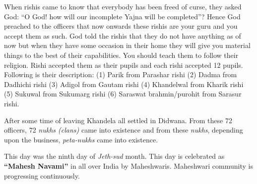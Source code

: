 When rishis came to know that everybody has been freed of curse, they asked God: ``O God! how will our incomplete Yajna will be completed''? Hence God preached to the officers that now onwards these rishis are your guru and you accept them as such. God told the rishis that they do not have anything as of now but when they have some occasion in their home they will give you material things to the best of their capabilities. You should teach them to follow their religion. Rishi accepted them as their pupils and each rishi accepted 12 pupils. Following is their description: 
(1) Parik from Parashar rishi (2) Dadma from Dadhichi rishi (3) Adigol from Gautam rishi (4) Khandelwal from Kharik rishi (5) Sukuwal from Sukumarg rishi (6) Saraswat brahmin/purohit from Sarasur rishi.

After some time of leaving Khandela all settled in Didwana. From these 72 officers, 72 \textit{nukhs (clans)} came into existence and from these \textit{nukhs}, depending upon the business, \textit{peta-nukhs} came into existence.

This day was the ninth day of \textit{Jeth-sud} month. This day is celebrated as \textbf{``Mahesh Navami''} in all over India by Maheshwaris. Maheshwari community is progressing continuously.
